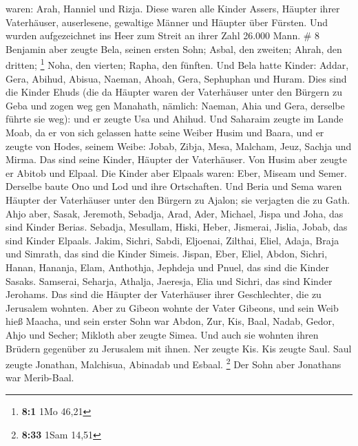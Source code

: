 waren: Arah, Hanniel und Rizja.  Diese waren alle Kinder
Assers, Häupter ihrer Vaterhäuser, auserlesene, gewaltige Männer und
Häupter über Fürsten. Und wurden aufgezeichnet ins Heer zum Streit an
ihrer Zahl 26.000 Mann. \# 8  Benjamin aber zeugte Bela,
seinen ersten Sohn; Asbal, den zweiten; Ahrah, den dritten; \footnote{\textbf{8:1}
  1Mo 46,21}  Noha, den vierten; Rapha, den fünften.
 Und Bela hatte Kinder: Addar, Gera, Abihud, 
Abisua, Naeman, Ahoah,  Gera, Sephuphan und Huram.
 Dies sind die Kinder Ehuds (die da Häupter waren der
Vaterhäuser unter den Bürgern zu Geba und zogen weg gen Manahath,
 nämlich: Naeman, Ahia und Gera, derselbe führte sie weg):
und er zeugte Usa und Ahihud.  Und Saharaim zeugte im Lande
Moab, da er von sich gelassen hatte seine Weiber Husim und Baara,
 und er zeugte von Hodes, seinem Weibe: Jobab, Zibja, Mesa,
Malcham,  Jeuz, Sachja und Mirma. Das sind seine Kinder,
Häupter der Vaterhäuser.  Von Husim aber zeugte er Abitob
und Elpaal.  Die Kinder aber Elpaals waren: Eber, Miseam
und Semer. Derselbe baute Ono und Lod und ihre Ortschaften.
 Und Beria und Sema waren Häupter der Vaterhäuser unter den
Bürgern zu Ajalon; sie verjagten die zu Gath.  Ahjo aber,
Sasak, Jeremoth,  Sebadja, Arad, Ader, 
Michael, Jispa und Joha, das sind Kinder Berias.  Sebadja,
Mesullam, Hiski, Heber,  Jismerai, Jislia, Jobab, das sind
Kinder Elpaals.  Jakim, Sichri, Sabdi, 
Eljoenai, Zilthai, Eliel,  Adaja, Braja und Simrath, das
sind die Kinder Simeis.  Jispan, Eber, Eliel, 
Abdon, Sichri, Hanan,  Hananja, Elam, Anthothja,
 Jephdeja und Pnuel, das sind die Kinder Sasaks.
 Samserai, Seharja, Athalja,  Jaeresja, Elia
und Sichri, das sind Kinder Jerohams.  Das sind die Häupter
der Vaterhäuser ihrer Geschlechter, die zu Jerusalem wohnten.
 Aber zu Gibeon wohnte der Vater Gibeons, und sein Weib
hieß Maacha,  und sein erster Sohn war Abdon, Zur, Kis,
Baal, Nadab,  Gedor, Ahjo und Secher;  Mikloth
aber zeugte Simea. Und auch sie wohnten ihren Brüdern gegenüber zu
Jerusalem mit ihnen.  Ner zeugte Kis. Kis zeugte Saul. Saul
zeugte Jonathan, Malchisua, Abinadab und Esbaal. \footnote{\textbf{8:33}
  1Sam 14,51}  Der Sohn aber Jonathans war Merib-Baal.
